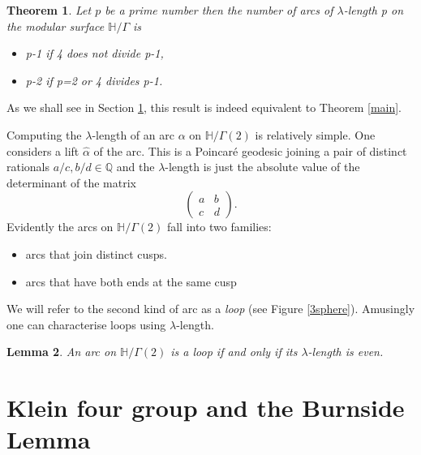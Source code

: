 \documentclass[12pt,a4paper]{amsart}
\newtheorem{thm}{Theorem}[section]
\newtheorem{lem}[thm]{Lemma}
\def\HH{\mathbb{H}}
\def\g2{\Gamma(2)}
\def\xx{\HH/\g2}
\begin{document}
\begin{thm}\label{modular arcs}
	Let $p$ be a prime number then the number of arcs of
	$\lambda$-length p on the modular surface
	$\mathbb{H}/\Gamma$ is 
	
	\begin{itemize}
		\item p-1 if 4 does not divide p-1,
		\item p-2 if p=2 or 4 divides p-1.
	\end{itemize}


\end{thm}

As we shall see in Section \ref{}, this result is indeed equivalent to Theorem \ref{main}. 

Computing the $\lambda$-length of an arc $\alpha$ on $\xx$ 
is relatively simple.
One considers a lift $\hat{\alpha}$ of the arc.
This is a Poincaré geodesic joining a pair of distinct rationals
$a/c,b/d \in \mathbb{Q}$ and the $\lambda$-length is just
the absolute value of the determinant of the matrix
$$ 
 \begin{pmatrix} a & b \\ c & d \end{pmatrix}.
$$
Evidently the arcs on $\xx$ fall into two families:
\begin{itemize}
	\item arcs that join distinct cusps. 
	\item arcs that have both ends at the same cusp
\end{itemize}
We will refer to the second kind of arc as a \textit{loop}
(see Figure \ref{3sphere}).
Amusingly one can characterise loops using $\lambda$-length.
\begin{lem}
	An arc on $\xx$ is a loop if and only if its
	$\lambda$-length is even.
\end{lem}


\section{Klein four group and the Burnside Lemma}
\end{document}
